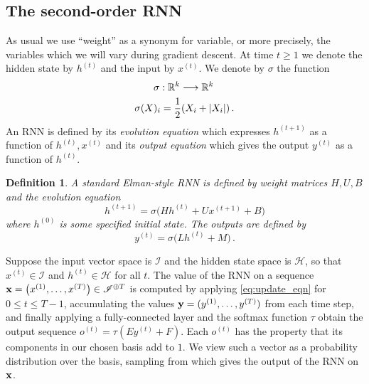 \documentclass[english,letter paper,12pt,leqno]{article}
\theoremstyle{example}
\newtheorem{definition}[theorem]{Definition}
\numberwithin{equation}{section}
\def\be{\begin{equation}}
\def\ee{\end{equation}}
\begin{document}
\subsection{The second-order RNN}

As usual we use ``weight'' as a synonym for variable, or more precisely, the variables which we will vary during gradient descent. At time $t \ge 1$ we denote the hidden state by $h^{(t)}$ and the input by $x^{(t)}$. We denote by $\sigma$ the function
\begin{gather*}
\sigma: \mathbb{R}^k \longrightarrow \mathbb{R}^k\,\\
\sigma( X )_i = \frac{1}{2}( X_i + |X_i| )\,.
\end{gather*}
An RNN is defined by its \emph{evolution equation} which expresses $h^{(t+1)}$ as a function of $h^{(t)}, x^{(t)}$ and its \emph{output equation} which gives the output $y^{(t)}$ as a function of $h^{(t)}$.

\begin{definition} A standard Elman-style RNN \cite{elman} is defined by weight matrices $H, U, B$ and the evolution equation
\be\label{eq:update_eqn}
h^{(t+1)} = \sigma\big( H h^{(t)} + U x^{(t+1)} + B\big)
\ee
where $h^{(0)}$ is some specified initial state. The outputs are defined by
\be\label{eq:output_rnn}
y^{(t)} = \sigma\big( L h^{(t)} + M \big)\,.
\ee
\end{definition}
Suppose the input vector space is $\mathscr{I}$ and the hidden state space is $\mathscr{H}$, so that $x^{(t)} \in \mathscr{I}$ and $h^{(t)} \in \mathscr{H}$ for all $t$. The value of the RNN on a sequence $\bold{x} = \big( x^{(1)}, \ldots, x^{(T)} \big) \in \mathscr{I}^{\oplus T}$ is computed by applying \eqref{eq:update_eqn} for $0 \le t \le T - 1$, accumulating the values $\bold{y} = (y^{(1)}, \ldots, y^{(T)})$ from each time step, and finally applying a fully-connected layer and the softmax function $\tau$ obtain the output sequence $o^{(t)} = \tau( E y^{(t)} + F )$. Each $o^{(t)}$ has the property that its components in our chosen basis add to $1$. We view such a vector as a probability distribution over the basis, sampling from which gives the output of the RNN on $\bold{x}$.
\\
\end{document}
